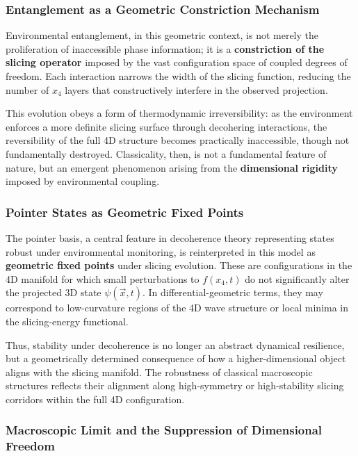 \documentclass[12pt]{article}
\begin{document}
\subsubsection*{Entanglement as a Geometric Constriction Mechanism}

Environmental entanglement, in this geometric context, is not merely the proliferation of inaccessible phase information; it is a \textbf{constriction of the slicing operator} imposed by the vast configuration space of coupled degrees of freedom. Each interaction narrows the width of the slicing function, reducing the number of $x_4$ layers that constructively interfere in the observed projection.

This evolution obeys a form of thermodynamic irreversibility: as the environment enforces a more definite slicing surface through decohering interactions, the reversibility of the full 4D structure becomes practically inaccessible, though not fundamentally destroyed. Classicality, then, is not a fundamental feature of nature, but an emergent phenomenon arising from the \textbf{dimensional rigidity} imposed by environmental coupling.

\subsubsection*{Pointer States as Geometric Fixed Points}

The pointer basis, a central feature in decoherence theory representing states robust under environmental monitoring, is reinterpreted in this model as \textbf{geometric fixed points} under slicing evolution. These are configurations in the 4D manifold for which small perturbations to $f(x_4, t)$ do not significantly alter the projected 3D state $\psi(\vec{x}, t)$. In differential-geometric terms, they may correspond to low-curvature regions of the 4D wave structure or local minima in the slicing-energy functional.

Thus, stability under decoherence is no longer an abstract dynamical resilience, but a geometrically determined consequence of how a higher-dimensional object aligns with the slicing manifold. The robustness of classical macroscopic structures reflects their alignment along high-symmetry or high-stability slicing corridors within the full 4D configuration.

\subsubsection*{Macroscopic Limit and the Suppression of Dimensional Freedom}
\end{document}
